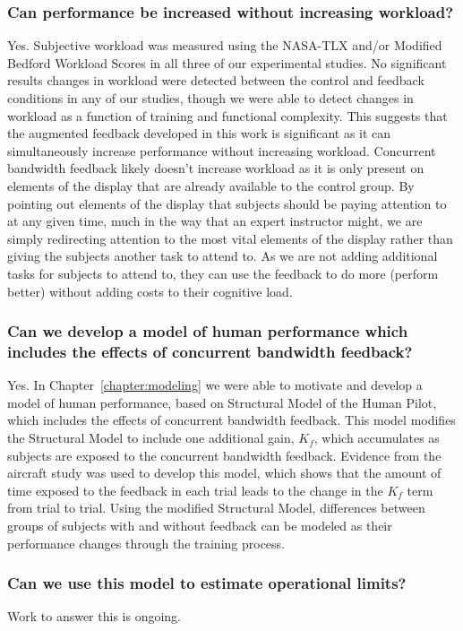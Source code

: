 \subsubsection{Can performance be increased without increasing workload?}
Yes.
Subjective workload was measured using the NASA-TLX and/or Modified Bedford Workload Scores in all three of our experimental studies.
No significant results changes in workload were detected between the control and feedback conditions in any of our studies, though we were able to detect changes in workload as a function of training and functional complexity.
This suggests that the augmented feedback developed in this work is significant as it can simultaneously increase performance without increasing workload.
Concurrent bandwidth feedback likely doesn't increase workload as it is only present on elements of the display that are already available to the control group.
By pointing out elements of the display that subjects should be paying attention to at any given time, much in the way that an expert instructor might, we are simply redirecting attention to the most vital elements of the display rather than giving the subjects another task to attend to.
As we are not adding additional tasks for subjects to attend to, they can use the feedback to do more (perform better) without adding costs to their cognitive load.

\subsubsection{Can we develop a model of human performance which includes the effects of concurrent bandwidth feedback?}
Yes.
In Chapter~\ref{chapter:modeling} we were able to motivate and develop a model of human performance, based on Structural Model of the Human Pilot, which includes the effects of concurrent bandwidth feedback.
This model modifies the Structural Model to include one additional gain, $K_f$, which accumulates as subjects are exposed to the concurrent bandwidth feedback.
Evidence from the aircraft study was used to develop this model, which shows that the amount of time exposed to the feedback in each trial leads to the change in the $K_f$ term from trial to trial.
Using the modified Structural Model, differences between groups of subjects with and without feedback can be modeled as their performance changes through the training process.

\subsubsection{Can we use this model to estimate operational limits?}
Work to answer this is ongoing.

